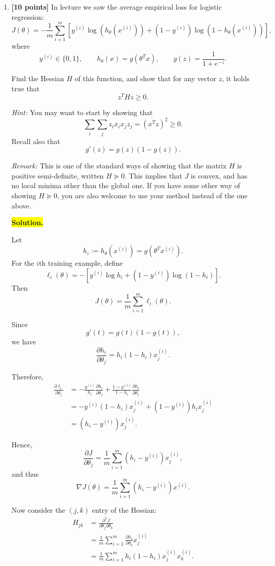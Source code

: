 \documentclass[10pt]{article}
\begin{document}
\begin{enumerate}
\begin{enumerate}[label=(\alph*)]
\item \textbf{[10 points]}
In lecture we saw the average empirical loss for logistic regression:
\[
J(\theta)
=
-\frac{1}{m}
\sum_{i=1}^{m}
\left[
y^{(i)}
\log\left(h_\theta(x^{(i)})\right)
+
(1-y^{(i)})
\log\left(1-h_\theta(x^{(i)})\right)
\right],
\]
where
\[
y^{(i)}\in\{0,1\},
\qquad
h_\theta(x)=g(\theta^Tx),
\qquad
g(z)=\frac{1}{1+e^{-z}}.
\]

Find the Hessian $H$ of this function, and show that for any vector
$z$, it holds true that
\[
z^THz\geq 0.
\]

\textit{Hint:}
You may want to start by showing that
\[
\sum_i\sum_j z_i x_i x_j z_j
=
(x^Tz)^2
\geq 0.
\]
Recall also that
\[
g'(z)=g(z)(1-g(z)).
\]

\textit{Remark:}
This is one of the standard ways of showing that the matrix $H$ is
positive semi-definite, written $H\succeq0$.
This implies that $J$ is convex, and has no local minima other than
the global one. If you have some other way of showing $H\succeq0$,
you are also welcome to use your method instead of the one above.
\vspace{5mm}

\noindent\colorbox{yellow}{\textbf{Solution.}}

Let
\[
h_i
:=
h_\theta(x^{(i)})
=
g(\theta^T x^{(i)}).
\]
For the $i$th training example, define
\[
\ell_i(\theta)
=
-
\left[
y^{(i)}\log h_i
+
(1-y^{(i)})\log(1-h_i)
\right].
\]
Then
\[
J(\theta)
=
\frac{1}{m}
\sum_{i=1}^m
\ell_i(\theta).
\]

Since
\[
g'(t)=g(t)(1-g(t)),
\]
we have
\[
\frac{\partial h_i}{\partial\theta_j}
=
h_i(1-h_i)x_j^{(i)}.
\]

Therefore,
\[
\begin{aligned}
\frac{\partial \ell_i}{\partial\theta_j}
&=
-\frac{y^{(i)}}{h_i}
\frac{\partial h_i}{\partial\theta_j}
+
\frac{1-y^{(i)}}{1-h_i}
\frac{\partial h_i}{\partial\theta_j}
\\
&=
-y^{(i)}(1-h_i)x_j^{(i)}
+
(1-y^{(i)})h_i x_j^{(i)}
\\
&=
(h_i-y^{(i)})x_j^{(i)}.
\end{aligned}
\]

Hence,
\[
\frac{\partial J}{\partial\theta_j}
=
\frac1m
\sum_{i=1}^m
(h_i-y^{(i)})x_j^{(i)},
\]
and thus
\[
\nabla J(\theta)
=
\frac1m
\sum_{i=1}^m
(h_i-y^{(i)})x^{(i)}.
\]

Now consider the $(j,k)$ entry of the Hessian:
\[
\begin{aligned}
H_{jk}
&=
\frac{\partial^2J}
{\partial\theta_j\partial\theta_k}
\\
&=
\frac1m
\sum_{i=1}^m
\frac{\partial h_i}{\partial\theta_k}
x_j^{(i)}
\\
&=
\frac1m
\sum_{i=1}^m
h_i(1-h_i)
x_j^{(i)}x_k^{(i)}.
\end{aligned}
\]


\end{enumerate}
\end{enumerate}
\end{document}
